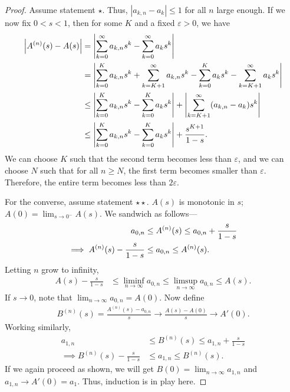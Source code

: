 \documentclass[15pt,a4paper]{book}
\theoremstyle{definition}
\newcommand{\abs}[1]{\left| #1 \right|} %
\begin{document}
\begin{proof}
    Assume statement $\star$. Thus, $\abs{a_{k,n} - a_{k}} \leq 1$ for all $n$ large enough. If we now fix $0 < s < 1$, then for some $K$ and a fixed $\varepsilon > 0$, we have
    \begin{align}
        \abs{A^{(n)}(s) - A(s)} &= \abs{\sum_{k=0}^{\infty} a_{k,n} s^{k} - \sum_{k=0}^{\infty} a_{k} s^{k}} \\
        &= \abs{\sum_{k=0}^{K} a_{k,n} s^{k} + \sum_{k=K+1}^{\infty} a_{k,n} s^{k} - \sum_{k=0}^{K} a_{k}s^{k} - \sum_{k=K+1}^{\infty} a_{k}s^{k}} \notag \\
        &\leq \abs{\sum_{k=0}^{K} a_{k,n} s^{k} - \sum_{k=0}^{K} a_{k}s^{k}} + \abs{\sum_{k=K+1}^{\infty} (a_{k,n}-a_{k}) s^{k}} \notag \\
        &\leq \abs{\sum_{k=0}^{K} a_{k,n} s^{k} - \sum_{k=0}^{K} a_{k}s^{k}} + \frac{s^{K+1}}{1-s}.
    \end{align}
    We can choose $K$ such that the second term becomes less than $\varepsilon$, and we can choose $N$ such that for all $n \geq N$, the first term becomes smaller than $\varepsilon$. Therefore, the entire term becomes less than $2\varepsilon$.

    For the converse, assume statement $\star \star$. $A(s)$ is monotonic in $s$; $A(0) = \lim_{s \to 0^{-}} A(s)$. We sandwich as follows---
    \begin{align}
        a_{0,n} &\leq A^{(n)}(s) \leq a_{0,n} + \frac{s}{1-s} \notag \\
        \implies A^{(n)}(s) - \frac{s}{1-s} &\leq a_{0,n} \leq A^{(n)}(s) \notag.
    \end{align}
    Letting $n$ grow to infinity,
    \begin{align}
        A(s) - \frac{s}{1-s} &\leq \liminf_{n \to \infty} a_{0,n} \leq \limsup_{n \to \infty} a_{0,n} \leq A(s).
    \end{align}
    If $s \to 0$, note that $\lim_{n \to \infty} a_{0,n} = A(0)$. Now define
    \begin{align}
        B^{(n)}(s) = \frac{A^{(n)}(s) - a_{0,n}}{s} \to \frac{A(s)-A(0)}{s} \to A'(0).
    \end{align}
    Working similarly,
    \begin{align}
        a_{1,n} &\leq B^{(n)}(s) \leq a_{1,n} + \frac{s}{1-s} \\
        \implies B^{(n)}(s) - \frac{s}{1-s} &\leq a_{1,n} \leq B^{(n)}(s).
    \end{align}
    If we again proceed as shown, we will get $B(0) = \lim_{n \to \infty} a_{1,n}$ and $a_{1,n} \to A'(0) = a_{1}$. Thus, induction is in play here.
\end{proof}
\end{document}

